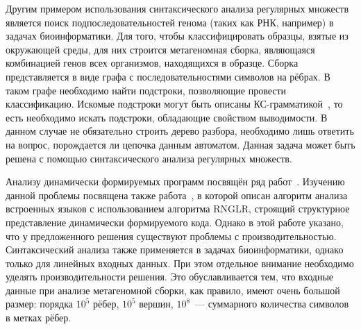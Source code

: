 Другим примером использования синтаксического анализа регулярных множеств является поиск подпоследовательностей генома (таких как РНК, например) в задачах биоинформатики. Для того, чтобы классифицировать образцы, взятые из окружающей среды, для них строится метагеномная сборка, являющаяся комбинацией генов всех организмов, находящихся в образце. Сборка представляется в виде графа с последовательностями символов на рёбрах. В таком графе необходимо найти подстроки, позволяющие провести классификацию. Искомые подстроки могут быть описаны КС-грамматикой~\cite{Anderson}, то есть необходимо искать подстроки, обладающие свойством выводимости. В данном случае не обязательно строить дерево разбора, необходимо лишь ответить на вопрос, порождается ли цепочка данным автоматом. Данная задача может быть решена с помощью синтаксического анализа регулярных множеств.

Анализу динамически формируемых программ посвящён ряд работ~\cite{LrAbstract1, LrAbstract2, LRAbstractParsingSema}.  Изучению данной проблемы посвящена также работа~\cite{RelaxedARNGLR}, в которой описан алгоритм анализа встроенных языков с использованием алгоритма RNGLR, строящий структурное представление динамически формируемого кода. Однако в этой работе указано, что у предложенного решения существуют проблемы с производительностью. Синтаксический анализа также применяется в задачах биоинформатики, однако только для линейных входных данных. При этом отдельное внимание необходимо уделять производительности решения. Это обуславливается тем, что входные данные при анализе метагеномной сборки, как правило, имеют очень большой размер: порядка $10^5$ рёбер, $10^5$ вершин, $10^8$~--- суммарного количества символов в метках рёбер. 
